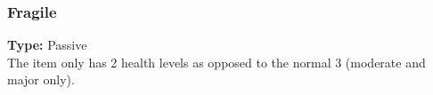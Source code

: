 \subsubsection{Fragile}
\label{iqty:fragile}
\textbf{Type:} Passive\\
The item only has 2 health levels as opposed to the
normal 3 (moderate and major only).
